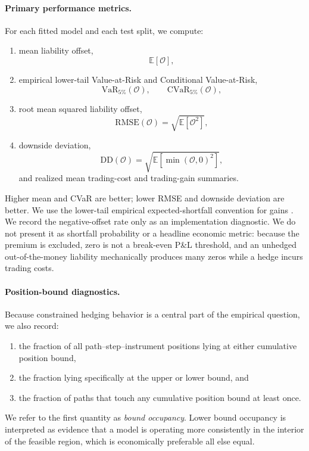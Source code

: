 \documentclass[sigconf]{acmart}
\begin{document}
\paragraph{Primary performance metrics.}
For each fitted model and each test split, we compute:
\begin{enumerate}
    \item mean liability offset,
    \[
    \mathbb{E}[\mathcal{O}],
    \]
    \item empirical lower-tail Value-at-Risk and Conditional Value-at-Risk,
    \[
    \mathrm{VaR}_{5\%}(\mathcal{O}), \qquad
    \mathrm{CVaR}_{5\%}(\mathcal{O}),
    \]
    \item root mean squared liability offset,
    \[
    \mathrm{RMSE}(\mathcal{O})
    =
    \sqrt{\mathbb{E}[\mathcal{O}^2]},
    \]
    \item downside deviation,
    \[
    \mathrm{DD}(\mathcal{O})
    =
    \sqrt{\mathbb{E}[\min(\mathcal{O},0)^2]},
    \]
    and realized mean trading-cost and trading-gain summaries.
\end{enumerate}
Higher mean and CVaR are better; lower RMSE and downside deviation are better.
We use the lower-tail empirical expected-shortfall convention for gains
\cite{rockafellar2000}.
We record the negative-offset rate only as an implementation diagnostic. We
do not present it as shortfall probability or a headline economic metric:
because the premium is excluded, zero is not a break-even P\&L threshold, and
an unhedged out-of-the-money liability mechanically produces many zeros while
a hedge incurs trading costs.

\paragraph{Position-bound diagnostics.}
Because constrained hedging behavior is a central part of the empirical question, we also record:
\begin{enumerate}
    \item the fraction of all path--step--instrument positions lying at either cumulative position bound,
    \item the fraction lying specifically at the upper or lower bound, and
    \item the fraction of paths that touch any cumulative position bound at least once.
\end{enumerate}
We refer to the first quantity as \emph{bound occupancy}. Lower bound occupancy is interpreted as evidence that a model is operating more consistently in the interior of the feasible region, which is economically preferable all else equal.
\end{document}
